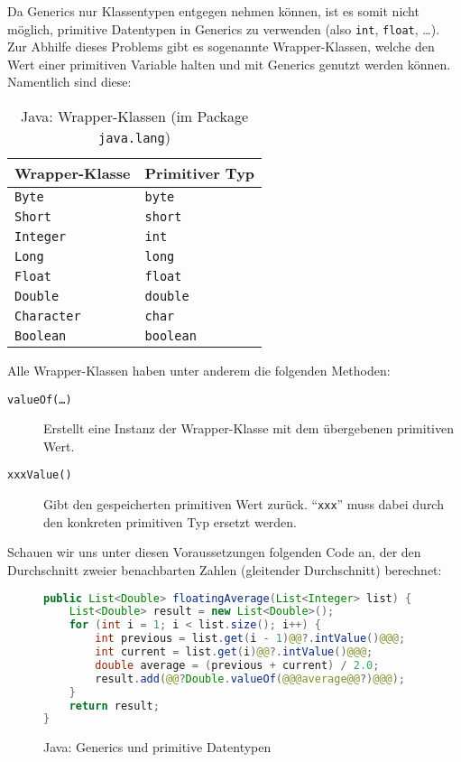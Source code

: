 		Da Generics nur Klassentypen entgegen nehmen können, ist es somit nicht möglich, primitive Datentypen in Generics zu verwenden (also \texttt{int}, \texttt{float}, \dots). Zur Abhilfe dieses Problems gibt es sogenannte Wrapper-Klassen, welche den Wert einer primitiven Variable halten und mit Generics genutzt werden können. Namentlich sind diese:
		\begin{table}[H]
			\centering
			\begin{tabular}{l | l}
				Wrapper-Klasse     & Primitiver Typ   \\ \hline
				\texttt{Byte}      & \texttt{byte}    \\
				\texttt{Short}     & \texttt{short}   \\
				\texttt{Integer}   & \texttt{int}     \\
				\texttt{Long}      & \texttt{long}    \\
				\texttt{Float}     & \texttt{float}   \\
				\texttt{Double}    & \texttt{double}  \\
				\texttt{Character} & \texttt{char}    \\
				\texttt{Boolean}   & \texttt{boolean}
			\end{tabular}
			\caption{Java: Wrapper-Klassen (im Package \texttt{java.lang})}
		\end{table}
		Alle Wrapper-Klassen haben unter anderem die folgenden Methoden:
		\begin{description}
			\item[\texttt{valueOf(\dots)}] Erstellt eine Instanz der Wrapper-Klasse mit dem übergebenen primitiven Wert.
			\item[\texttt{xxxValue()}]     Gibt den gespeicherten primitiven Wert zurück. \enquote{\texttt{xxx}} muss dabei durch den konkreten primitiven Typ ersetzt werden.
		\end{description}
		
		Schauen wir uns unter diesen Voraussetzungen folgenden Code an, der den Durchschnitt zweier benachbarten Zahlen (gleitender Durchschnitt) berechnet:
		\begin{figure}[H]
			\centering
			\begin{lstlisting}[language = Java, style = base]
public List<Double> floatingAverage(List<Integer> list) {
	List<Double> result = new List<Double>();
	for (int i = 1; i < list.size(); i++) {
		int previous = list.get(i - 1)@@?.intValue()@@@;
		int current = list.get(i)@@?.intValue()@@@;
		double average = (previous + current) / 2.0;
		result.add(@@?Double.valueOf(@@@average@@?)@@@);
	}
	return result;
}
			\end{lstlisting}
			\caption{Java: Generics und primitive Datentypen}
			\label{fig:java_generics_motivation_gen}
		\end{figure}
		
